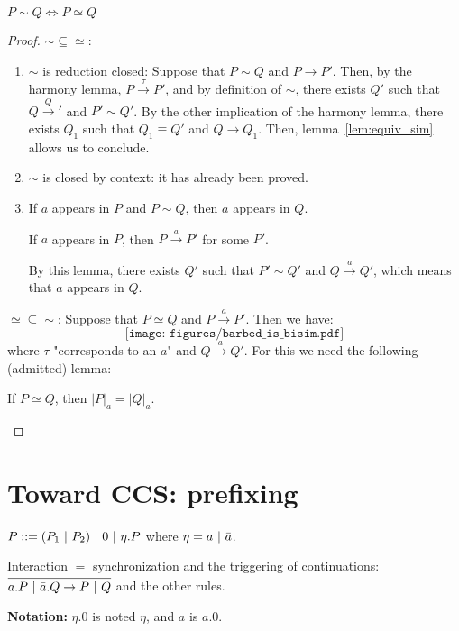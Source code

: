 	\begin{theo}
	$P \sim Q \Leftrightarrow P \simeq Q$
	\end{theo}
	\begin{proof}
		$\sim \subseteq \simeq$:
		
		\begin{enumerate}
				\item $\sim$ is reduction closed:
				Suppose that $P \sim Q$ and $P\rightarrow P'$. Then, by the harmony lemma, $P \xrightarrow \tau P'$, and by definition of $\sim$, there exists $Q'$ such that $Q \xrightarrow Q'$ and $P' \sim Q'$. By the other implication of the harmony lemma, there exists $Q_1$ such that $Q_1 \equiv Q'$ and $Q\rightarrow Q_1$. Then, lemma~\ref{lem:equiv_sim} allows us to conclude.
				
				\item $\sim$ is closed by context: it has already been proved.
				
				\item If $a$ appears in $P$ and $P\sim Q$, then $a$ appears in $Q$.
				\begin{lemma}[admitted]
					If $a$ appears in $P$, then $P\xrightarrow a P'$ for some $P'$.
				\end{lemma}
				By this lemma, there exists $Q'$ such that $P' \sim Q'$ and $Q \xrightarrow a Q'$, which means that $a$ appears in $Q$.
		\end{enumerate}
		
		$\simeq \subseteq \sim$: Suppose that $P \simeq Q$ and $P \xrightarrow a P'$.
		Then we have: $$\texttt{[image: figures/barbed\_is\_bisim.pdf]}$$ where $\tau$ "corresponds to an $a$" and $Q \xrightarrow a Q'$.
		For this we need the following (admitted) lemma:
		\begin{lemma}
			If $P \simeq Q$, then $|P|_{a} = |Q|_{a}$.
		\end{lemma}		
	\end{proof}
	
\section{Toward CCS: prefixing}

$P ::= (P_1 \ |\  P_{2}) \ |\  0 \ |\  \eta . P$ where $\eta = a \ |\  \bar a$.

Interaction $=$ synchronization and the triggering of continuations: $\infer{a.P \parc \bar a .Q \rightarrow P \parc Q}{}$ and the other rules. 

\textbf{Notation:} $\eta .0$ is noted $\eta$, and $a$ is $a.0$.


